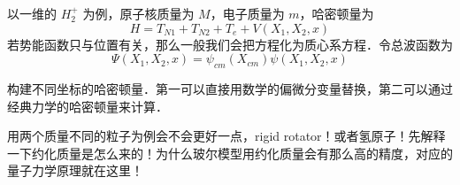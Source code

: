 以一维的 $H_2^+$ 为例，原子核质量为 $M$，电子质量为 $m$，哈密顿量为
\begin{equation}
H = T_{N1} + T_{N2} + T_{e} + V(X_1,X_2,x)
\end{equation}
若势能函数只与位置有关，那么一般我们会把方程化为质心系方程．令总波函数为
\begin{equation}
\Psi(X_1,X_2,x) = \psi_{cm}(X_{cm})\psi(X_1,X_2,x)
\end{equation}

构建不同坐标的哈密顿量．第一可以直接用数学的偏微分变量替换，第二可以通过经典力学的哈密顿量来计算．

用两个质量不同的粒子为例会不会更好一点，rigid rotator！或者氢原子！先解释一下约化质量是怎么来的！为什么玻尔模型用约化质量会有那么高的精度，对应的量子力学原理就在这里！